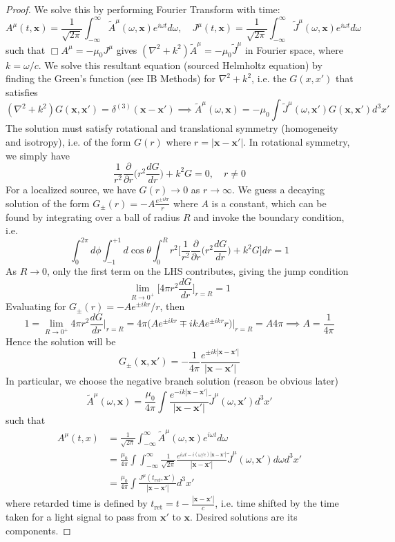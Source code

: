 \documentclass[a4paper]{article}
\theoremstyle{new}
\begin{document}
\begin{proof}
We solve this by performing Fourier Transform with time:
$$A^\mu(t,\mathbf{x})=\frac{1}{\sqrt{2\pi}}\int_{-\infty}^\infty\tilde{A}^\mu(\omega,\mathbf{x})e^{i\omega t}d\omega,\quad J^\mu(t,\mathbf{x})=\frac{1}{\sqrt{2\pi}}\int_{-\infty}^\infty\tilde{J}^\mu(\omega,\mathbf{x})e^{i\omega t}d\omega$$
such that $\Box A^\mu=-\mu_0J^\mu$ gives $(\nabla^2+k^2)\tilde{A}^\mu=-\mu_0\tilde{J}^\mu$ in Fourier space, where $k=\omega/c$. We solve this resultant equation (sourced Helmholtz equation) by finding the Green's function (see IB Methods) for $\nabla^2+k^2$, i.e. the $G(x,x')$ that satisfies
$$(\nabla^2+k^2)G(\mathbf{x},\mathbf{x'})=\delta^{(3)}(\mathbf{x}-\mathbf{x'})\implies\tilde{A}^\mu(\omega,\mathbf{x})=-\mu_0\int\tilde{J}^\mu(\omega,\mathbf{x'})G(\mathbf{x},\mathbf{x'})d^3x'$$ 
The solution must satisfy rotational and translational symmetry (homogeneity and isotropy), i.e. of the form $G(r)$ where $r=|\mathbf{x}-\mathbf{x'}|$. In rotational symmetry, we simply have
$$\frac{1}{r^2}\frac{\partial}{\partial r}\bigg(r^2\frac{dG}{dr}\bigg)+k^2G=0,\quad r\neq 0$$
For a localized source, we have $G(r)\rightarrow0$ as $r\rightarrow\infty$. We guess a decaying solution of the form $G_\pm (r)=-A\frac{e^{\pm ikr}}{r}$ where $A$ is a constant, which can be found by integrating over a ball of radius $R$ and invoke the boundary condition, i.e.
$$\int_0^{2\pi} d\phi\int_{-1}^{+1}d\cos\theta\int_0^Rr^2\bigg[\frac{1}{r^2}\frac{\partial}{\partial r}\bigg(r^2\frac{dG}{dr}\bigg)+k^2G\bigg]dr=1$$
As $R\rightarrow 0$, only the first term on the LHS contributes, giving the jump condition
$$\lim_{R\rightarrow0^+}\bigg[4\pi r^2\frac{dG}{dr}\bigg]_{r=R}=1$$
Evaluating for $G_{\pm}(r)=-Ae^{\pm ikr}/r$, then
$$1=\lim_{R\rightarrow0^+}4\pi r^2\frac{dG}{dr}\bigg|_{r=R}=4\pi\bigg(Ae^{\pm ikr}\mp ikAe^{\pm ikr}r\bigg)\bigg|_{r=R}=A4\pi\implies A=\frac{1}{4\pi}$$
Hence the solution will be 
$$G_\pm(\mathbf{x},\mathbf{x'})=-\frac{1}{4\pi}\frac{e^{\pm ik|\mathbf{x}-\mathbf{x'}|}}{|\mathbf{x}-\mathbf{x'}|}$$
In particular, we choose the negative branch solution (reason be obvious later)
$$\tilde{A}^\mu(\omega,\mathbf{x})=\frac{\mu_0}{4\pi}\int\frac{e^{-ik|\mathbf{x}-\mathbf{x'}|}}{|\mathbf{x}-\mathbf{x'}|}\tilde{J}^\mu(\omega,\mathbf{x'})d^3x'$$
such that
\begin{align}
A^\mu(t,x)&=\frac{1}{\sqrt{2\pi}}\int_{-\infty}^\infty\tilde{A}^\mu(\omega,\mathbf{x})e^{i\omega t}d\omega\nonumber\\&=\frac{\mu_0}{4\pi}\int\int_{-\infty}^\infty\frac{1}{\sqrt{2\pi}}\frac{e^{i\omega t-i(\omega/c)|\mathbf{x}-\mathbf{x'}|}}{|\mathbf{x}-\mathbf{x'}|}\tilde{J}^\mu(\omega,\mathbf{x'})d\omega d^3x'\nonumber\\&=\frac{\mu_0}{4\pi}\int\frac{J^\mu(t_{ret},\mathbf{x'})}{|\mathbf{x}-\mathbf{x'}|}d^3x'\nonumber
\end{align}
where retarded time is defined by $t_{\text{ret}}=t-\frac{|\mathbf{x}-\mathbf{x'}|}{c}$, i.e. time shifted by the time taken for a light signal to pass from $\mathbf{x'}$ to $\mathbf{x}$. Desired solutions are its components.
\end{proof}
\end{document}

